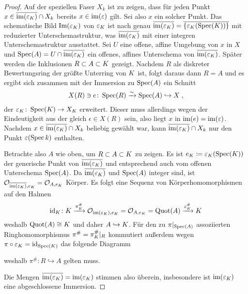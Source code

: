 \begin{Lemma}
\begin{proof}
    Auf der speziellen Faser $X_k$ ist zu zeigen, dass für jeden
    Punkt $x\in\overline{\operatorname{im}(\varepsilon_{K})}\cap X_k$ bereits
    $x\in\operatorname{im}(\varepsilon)$ gilt. Sei also $x$ ein solcher Punkt.
    Das schematische Bild $\text{Im}(\varepsilon_{K})$ von $\varepsilon_{K}$ ist
    nach \cite[Remark~10.32]{wedhorn} genau
    $\overline{\operatorname{im}(\varepsilon_{K})}=\overline{\{\varepsilon_{K}(\operatorname{Spec}(K))\}}$
    mit reduzierter Unterschemastruktur, was
    $\overline{\operatorname{im}(\varepsilon_{K})}$ mit einer integren
    Unterschemastruktur ausstattet.
    Sei $U$ eine offene, affine Umgebung von $x$ in $X$ und
    $\operatorname{Spec}(A)=U\cap\overline{\operatorname{im}(\varepsilon_{K})}$ ein offenes, affines
    Unterschema von $\overline{\operatorname{im}(\varepsilon_{K})}$.
    Später werden die Inklusionen $R\subset A\subset K$ gezeigt.
    Nachdem $R$ als diskreter Bewertungsring der größte Unterring
    von $K$ ist, folgt daraus dann $R=A$ und es ergibt sich zusammen
    mit der Immersion zu $\operatorname{Spec}(A)$ ein Schnitt
    \begin{gather*}
      X(R)\ni e\colon
      \operatorname{Spec}(R)\xrightarrow{\sim}\operatorname{Spec}(A)\hookrightarrow X\;,
    \end{gather*}
    der $\varepsilon_{K}\colon\operatorname{Spec}(K)\to X_{K}$ erweitert.
    Dieser muss allerdings wegen der Eindeutigkeit aus der \NAbbEig
    gleich $\epsilon\in X(R)$ sein, also liegt $x$ in
    $\operatorname{im}(e)=\operatorname{im}(\varepsilon)$.
    Nachdem $x\in \overline{\operatorname{im}(\varepsilon_{K})}\cap X_k$ beliebig
    gewählt war, kann $\overline{\operatorname{im}(\varepsilon_{K})}\cap X_k$ nur
    den Punkt $\varepsilon(\operatorname{Spec} k)$ enthalten.

    Betrachte also $A$ wie oben, um $R\subset A\subset K$ zu
    zeigen. Es ist $e_{K}\coloneqq\varepsilon_{K}(\operatorname{Spec}(K))$ der
    generische Punkt von $\overline{\operatorname{im}(\varepsilon_{K})}$ und
    entsprechend auch vom offenen Unterschema $\operatorname{Spec}(A)$. Da
    $\overline{\operatorname{im}(\varepsilon_{K})}$ und $\operatorname{Spec}(A)$ integer sind, ist
    $\mathcal{O}_{\overline{\text{im}(\varepsilon_{K})}, e_{K}}=\mathcal{O}_{A,e_{K}}$ Körper.
    Es folgt eine Sequenz von Körperhomomorphismen auf den Halmen
    \begin{gather*}
      \mathrm{id}_{K}\colon
      K \xrightarrow{\pi_{K}^\#}
      \mathcal{O}_{\text{im}(\varepsilon_{K}), e_{K}} = \mathcal{O}_{A,e_{K}} = \operatorname{Quot}(A)
      \xrightarrow{\varepsilon_{K}^\#} K
    \end{gather*}
    weshalb $\operatorname{Quot}(A)\cong K$ und daher $A\hookrightarrow K$.
    Für den zu $\pi|_{\operatorname{Spec}(A)}$ assoziierten
    Ringhomomorphismus $\pi^\#=\pi_{K}^\#|_R$ kommutiert außerdem wegen
    $\pi\circ\varepsilon_{K}=\mathrm{id}_{\operatorname{Spec}(K)}$ das folgende Diagramm
    \begin{center}
    \end{center}
    weshalb $\pi^\#\colon R\hookrightarrow A$ gelten muss.
    
    Die Mengen $\overline{\operatorname{im}(\varepsilon_{K})}=\operatorname{im}(\varepsilon_{K})$ stimmen
    also überein, insbesondere ist $\operatorname{im}(\varepsilon_{K})$ eine
    abgeschlossene Immersion.
  \end{proof}
\end{Lemma}

